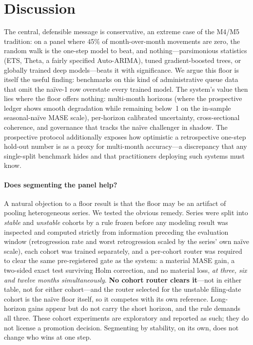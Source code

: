 \documentclass[runningheads]{llncs}
\begin{document}
\section{Discussion}
\label{sec:discussion}

The central, defensible message is conservative, an extreme case of the M4/M5
tradition: on a panel where 45\% of month-over-month movements are zero, the
random walk is the one-step model to beat, and nothing---parsimonious statistics
(ETS, Theta, a fairly specified Auto-ARIMA), tuned gradient-boosted trees, or
globally trained deep models---beats it with significance. We argue this floor is
itself the useful finding: benchmarks on this kind of administrative queue data
that omit the naïve-1 row overstate every trained model. The system's value then
lies where the floor offers nothing: multi-month horizons (where the prospective
ledger shows smooth degradation while remaining below~1 on the in-sample
seasonal-naïve MASE scale),
per-horizon calibrated uncertainty, cross-sectional coherence, and governance that
tracks the naïve challenger in shadow. The prospective protocol additionally
exposes how optimistic a retrospective one-step hold-out number is as a proxy for
multi-month accuracy---a discrepancy that any single-split benchmark hides and that
practitioners deploying such systems must know.

\paragraph{Does segmenting the panel help?} A natural objection to a floor result is
that the floor may be an artifact of pooling heterogeneous series. We tested the
obvious remedy. Series were split into \emph{stable} and \emph{unstable} cohorts by a
rule frozen before any modeling result was inspected and computed strictly from
information preceding the evaluation window (retrogression rate and worst
retrogression scaled by the series' own naïve scale), each cohort was trained
separately, and a per-cohort router was required to clear the same pre-registered
gate as the system: a material MASE gain, a two-sided exact test surviving Holm
correction, and no material loss, \emph{at three, six and twelve months
simultaneously}. \textbf{No cohort router clears it}---not in either table, not for
either cohort---and the router selected for the unstable filing-date cohort is the
naïve floor itself, so it competes with its own reference. Long-horizon gains appear
but do not carry the short horizon, and the rule demands all three. These cohort
experiments are exploratory and reported as such; they do not license a promotion
decision. Segmenting by stability, on its own, does not change who wins at one step.
\end{document}
